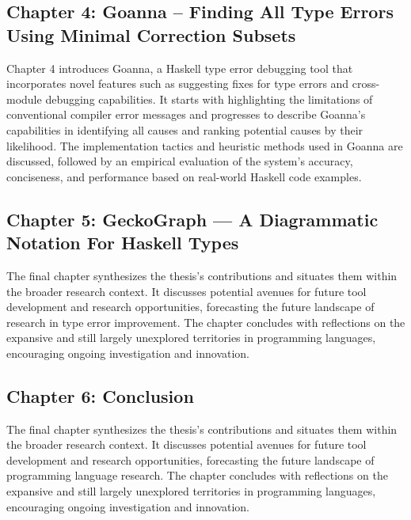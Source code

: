 \subsection{Chapter 4: Goanna -- Finding All Type Errors Using Minimal Correction Subsets}
Chapter 4 introduces Goanna, a Haskell type error debugging tool that incorporates novel features such as suggesting fixes for type errors and cross-module debugging capabilities. It starts with highlighting the limitations of conventional compiler error messages and progresses to describe Goanna's capabilities in identifying all causes and ranking potential causes by their likelihood. The implementation tactics and heuristic methods used in Goanna are discussed, followed by an empirical evaluation of the system's accuracy, conciseness, and performance based on real-world Haskell code examples.
    
\subsection{Chapter 5: GeckoGraph — A Diagrammatic Notation For Haskell Types}
The final chapter synthesizes the thesis's contributions and situates them within the broader research context. It discusses potential avenues for future tool development and research opportunities, forecasting the future landscape of research in type error improvement. The chapter concludes with reflections on the expansive and still largely unexplored territories in programming languages, encouraging ongoing investigation and innovation.

    
\subsection{Chapter 6: Conclusion}
The final chapter synthesizes the thesis's contributions and situates them within the broader research context. It discusses potential avenues for future tool development and research opportunities, forecasting the future landscape of programming language research. The chapter concludes with reflections on the expansive and still largely unexplored territories in programming languages, encouraging ongoing investigation and innovation.